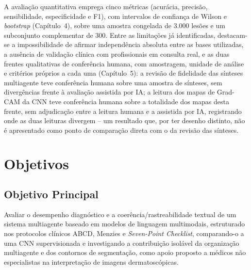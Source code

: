 A avaliação quantitativa emprega cinco métricas (acurácia, precisão, sensibilidade, especificidade e F1), com intervalos de confiança de Wilson e \textit{bootstrap} (Capítulo~4), sobre uma amostra congelada de 3.000 lesões e um subconjunto complementar de 300. Entre as limitações já identificadas, destacam-se a impossibilidade de afirmar independência absoluta entre as bases utilizadas, a ausência de validação clínica com profissionais em consulta real, e as duas frentes qualitativas de conferência humana, com amostragem, unidade de análise e critérios próprios a cada uma (Capítulo~5): a revisão de fidelidade das sínteses multiagente teve conferência humana sobre uma amostra de sínteses, sem divergências frente à avaliação assistida por IA; a leitura dos mapas de Grad-CAM da CNN teve conferência humana sobre a totalidade dos mapas desta frente, sem adjudicação entre a leitura humana e a assistida por IA, registrando onde as duas leituras divergem -- um resultado que, por ter desenho distinto, não é apresentado como ponto de comparação direta com o da revisão das sínteses.

\section{Objetivos}

\subsection{Objetivo Principal}
Avaliar o desempenho diagnóstico e a coerência/rastreabilidade textual de um sistema multiagente baseado em modelos de linguagem multimodais, estruturado nos protocolos clínicos ABCD, Menzies e \textit{Seven-Point Checklist}, comparando-o a uma CNN supervisionada e investigando a contribuição isolável da organização multiagente e dos contornos de segmentação, como apoio proposto a médicos não especialistas na interpretação de imagens dermatoscópicas.


